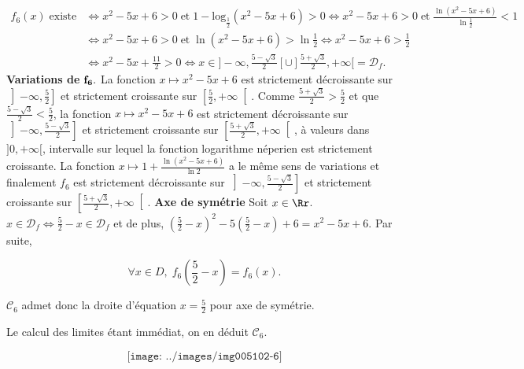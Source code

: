 {\begin{enumerate}
{\begin{align*}
f_6(x)\;\mbox{existe}&\Leftrightarrow x^2-5x+6>0\;\mbox{et}\;1-\mbox{log}_{\frac{1}{2}}(x^2-5x+6)>0
\Leftrightarrow x^2-5x+6>0\;\mbox{et}\;\frac{\ln(x^2-5x+6)}{\ln\frac{1}{2}}<1\\
 &\Leftrightarrow x^2-5x+6>0\;\mbox{et}\;\ln(x^2-5x+6)>\ln\frac{1}{2}\Leftrightarrow x^2-5x+6>\frac{1}{2}\\
 &\Leftrightarrow x^2-5x+\frac{11}{2}>0\Leftrightarrow x\in]-\infty,\frac{5-\sqrt{3}}{2}[\cup]\frac{5+\sqrt{3}}{2},+\infty[=\mathcal{D}_f.
\end{align*}
\textbf{Variations de} $\bf{f_6.}$ La fonction $x\mapsto x^2-5x+6$ est strictement décroissante sur
$\left]-\infty,\frac{5}{2}\right]$ et strictement croissante sur $\left[\frac{5}{2},+\infty\right[$. Comme
$\frac{5+\sqrt{3}}{2}>\frac{5}{2}$ et que $\frac{5-\sqrt{3}}{2}<\frac{5}{2}$, la fonction $x\mapsto x^2-5x+6$ est
strictement décroissante sur$\left]-\infty,\frac{5-\sqrt{3}}{2}\right]$ et strictement croissante sur
$\left[\frac{5+\sqrt{3}}{2},+\infty\right[$, à valeurs dans $]0,+\infty[$, intervalle sur lequel la fonction logarithme néperien
est strictement croissante. La fonction $x\mapsto1+\frac{\ln(x^2-5x+6)}{\ln2}$ a le même sens de variations et
finalement $f_6$ est strictement décroissante sur $\left]-\infty,\frac{5-\sqrt{3}}{2}\right]$ et strictement croissante
sur $\left[\frac{5+\sqrt{3}}{2},+\infty\right[$.
\textbf{Axe de symétrie} Soit $x\in\Rr$. $x\in\mathcal{D}_f\Leftrightarrow\frac{5}{2}-x\in\mathcal{D}_f$ et de 
plus, $\left(\frac{5}{2}-x\right)^2-5\left(\frac{5}{2}-x\right)+6=x^2-5x+6$. Par suite,

$$\forall x\in D,\;f_6(\frac{5}{2}-x)=f_6(x).$$

$\mathcal{C}_6$ admet donc la droite d'équation $x=\frac{5}{2}$ pour axe de symétrie.

Le calcul des limites étant immédiat, on en déduit $\mathcal{C}_6$.

$$\texttt{[image: ../images/img005102-6]}$$}
\end{enumerate}
}